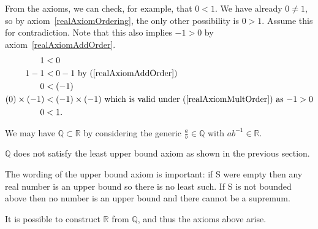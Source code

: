 \documentclass[../Main.tex]{subfiles}
\begin{document}
\begin{remarks}
    \item From the axioms, we can check, for example, that $0<1$. We have already $0 \neq 1$, so by axiom~\ref{realAxiomOrdering}, the only other possibility is $0>1$. Assume this for contradiction. Note that this also implies $-1 > 0$ by axiom~\ref{realAxiomAddOrder}.
    \begin{align*}
        1 &< 0 \\
        1-1 &< 0-1 \text{ by (\ref{realAxiomAddOrder})}\\
        0 &< (-1) \\
        (0) \times (-1) &< (-1) \times (-1) \text{ which is valid under (\ref{realAxiomMultOrder}) as $-1 > 0$} \\
        0 &< 1.
    \end{align*} \contradiction
    \item We may have $\mathbb{Q} \subset \mathbb{R}$ by considering the generic $\frac{a}{b} \in \mathbb{Q}$ with $ab^{-1} \in \mathbb{R}$.
    \item  $\mathbb{Q}$ does not satisfy the least upper bound axiom as shown in the previous section.
    \item The wording of the upper bound axiom is important: if S were empty then any real number is an upper bound so there is no least such. If S is not bounded above then no number is an upper bound and there cannot be a supremum.
    \item It is possible to construct $\mathbb{R}$ from $\mathbb{Q}$, and thus the axioms above arise.
\end{remarks}
\end{document}
